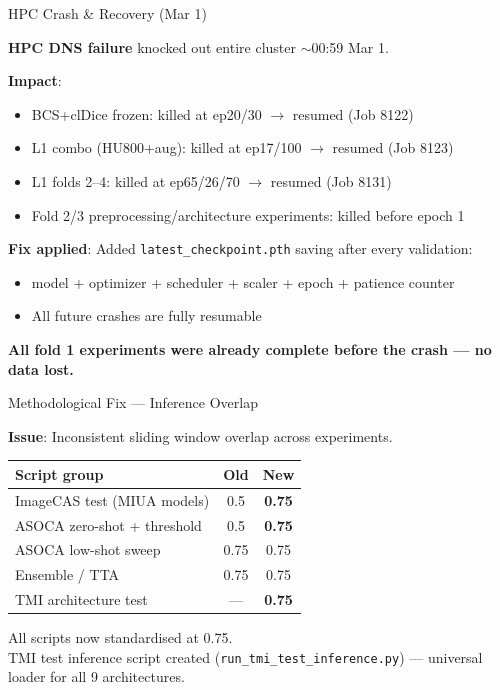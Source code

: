 \documentclass[aspectratio=169,10pt]{beamer}
\newcommand{\good}[1]{\textcolor{green!60!black}{\textbf{#1}}}
\begin{document}
\begin{frame}{HPC Crash \& Recovery (Mar 1)}

\textbf{HPC DNS failure} knocked out entire cluster $\sim$00:59 Mar 1.

\vspace{0.3cm}
\textbf{Impact}:
\begin{itemize}
    \item BCS+clDice frozen: killed at ep20/30 $\rightarrow$ resumed (Job 8122)
    \item L1 combo (HU800+aug): killed at ep17/100 $\rightarrow$ resumed (Job 8123)
    \item L1 folds 2--4: killed at ep65/26/70 $\rightarrow$ resumed (Job 8131)
    \item Fold 2/3 preprocessing/architecture experiments: killed before epoch 1
\end{itemize}

\vspace{0.3cm}
\textbf{Fix applied}: Added \texttt{latest\_checkpoint.pth} saving after every validation:
\begin{itemize}
    \item model + optimizer + scheduler + scaler + epoch + patience counter
    \item All future crashes are fully resumable
\end{itemize}

\vspace{0.2cm}
\good{All fold 1 experiments were already complete before the crash --- no data lost.}

\end{frame}

\begin{frame}{Methodological Fix --- Inference Overlap}

\textbf{Issue}: Inconsistent sliding window overlap across experiments.

\vspace{0.3cm}
\centering
\begin{tabular}{l c c}
\toprule
\textbf{Script group} & \textbf{Old} & \textbf{New} \\
\midrule
ImageCAS test (MIUA models) & 0.5 & \good{0.75} \\
ASOCA zero-shot + threshold & 0.5 & \good{0.75} \\
ASOCA low-shot sweep & 0.75 & 0.75 \\
Ensemble / TTA & 0.75 & 0.75 \\
TMI architecture test & --- & \good{0.75} \\
\bottomrule
\end{tabular}

\vspace{0.3cm}
All scripts now standardised at 0.75.\\
TMI test inference script created (\texttt{run\_tmi\_test\_inference.py}) --- universal loader for all 9 architectures.

\end{frame}
\end{document}
